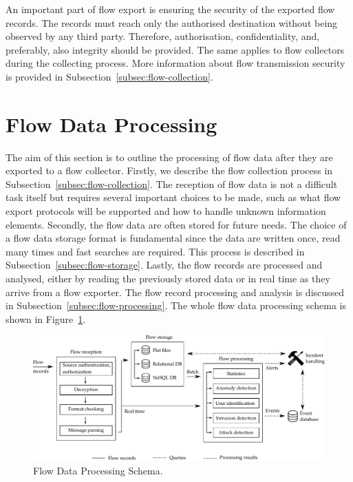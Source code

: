 An important part of flow export is ensuring the security of the exported flow records. The records must reach only the authorised destination without being observed by any third party. Therefore, authorisation, confidentiality, and, preferably, also integrity should be provided. The same applies to flow collectors during the collecting process. More information about flow transmission security is provided in Subsection~\ref{subsec:flow-collection}.

\section{Flow Data Processing}\label{sec:flow-data-processing}

The aim of this section is to outline the processing of flow data after they are exported to a flow collector. Firstly, we describe the flow collection process in Subsection~\ref{subsec:flow-collection}. The reception of flow data is not a difficult task itself but requires several important choices to be made, such as what flow export protocols will be supported and how to handle unknown information elements. Secondly, the flow data are often stored for future needs. The choice of a flow data storage format is fundamental since the data are written once, read many times and fast searches are required. This process is described in Subsection~\ref{subsec:flow-storage}. Lastly, the flow records are processed and analysed, either by reading the previously stored data or in real time as they arrive from a flow exporter. The flow record processing and analysis is discussed in Subsection~\ref{subsec:flow-processing}. The whole flow data processing schema is shown in Figure~\ref{fig:flow-processing-details}.

\begin{figure}
  \begin{center}
    \includegraphics{figures/c02/flow-processing-details}
  \end{center}
  \caption{Flow Data Processing Schema.}
  \label{fig:flow-processing-details}
\end{figure}

